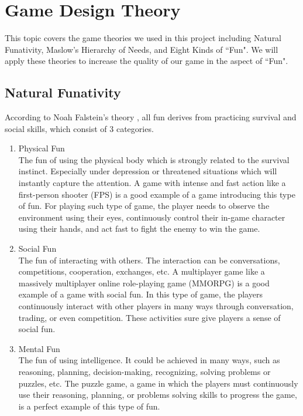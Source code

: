 \documentclass[12pt,oneside,openright,a4paper]{cpe-english-project}
\begin{document}


\section{Game Design Theory}
This topic covers the game theories we used in this project including Natural Funativity, Maslow's Hierarchy of Needs, and Eight Kinds of ``Fun". We will apply these theories to increase the quality of our game in the aspect of ``Fun".

\subsection{Natural Funativity}
According to Noah Falstein's theory \cite{steve2005introduction}, all fun derives from practicing survival and social skills, which consist of 3 categories.

\begin{enumerate}
	\item Physical Fun \\
	The fun of using the physical body which is strongly related to the survival instinct. Especially under depression or threatened situations which will instantly capture the attention. A game with intense and fast action like a first-person shooter (FPS) is a good example of a game introducing this type of fun. For playing such type of game, the player needs to observe the environment using their eyes, continuously control their in-game character using their hands, and act fast to fight the enemy to win the game.
	\item Social Fun \\
	The fun of interacting with others. The interaction can be conversations, competitions, cooperation, exchanges, etc. A multiplayer game like a massively multiplayer online role-playing game (MMORPG) is a good example of a game with social fun. In this type of game, the players continuously interact with other players in many ways through conversation, trading, or even competition. These activities sure give players a sense of social fun.
	\item Mental Fun \\
	The fun of using intelligence. It could be achieved in many ways, such as reasoning, planning, decision-making, recognizing, solving problems or puzzles, etc. The puzzle game, a game in which the players must continuously use their reasoning, planning, or problems solving skills to progress the game, is a perfect example of this type of fun.
\end{enumerate}
\end{document}
